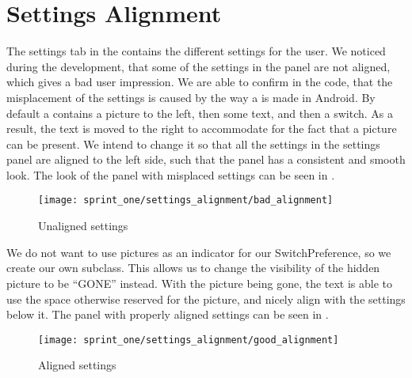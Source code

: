 \section{Settings Alignment}
\label{sec:settings_alignment}

The settings tab in the \launcher contains the different settings for the user. We noticed during the development, that some of the settings in the panel are not aligned, which gives a bad user impression. We are able to confirm in the code, that the misplacement of the settings is caused by the way a  is made in Android. By default a  contains a picture to the left, then some text, and then a switch. As a result, the text is moved to the right to accommodate for the fact that a picture can be present. We intend to change it so that all the settings in the settings panel are aligned to the left side, such that the panel has a consistent and smooth look. The look of the panel with misplaced settings can be seen in . \\

\begin{figure}[!htbp]
    \centering
    \texttt{[image: sprint\_one/settings\_alignment/bad\_alignment]}
    \caption{Unaligned settings}
    \label{fig:settings_alignment_bad}
\end{figure}

We do not want to use pictures as an indicator for our SwitchPreference, so we create our own  subclass. This allows us to change the visibility of the hidden picture to be ``GONE'' instead. With the picture being gone, the text is able to use the space otherwise reserved for the picture, and nicely align with the settings below it. The panel with properly aligned settings can be seen in . \\

\begin{figure}[!htbp]
    \centering
    \texttt{[image: sprint\_one/settings\_alignment/good\_alignment]}
    \caption{Aligned settings}
    \label{fig:settings_alignment_good}
\end{figure}